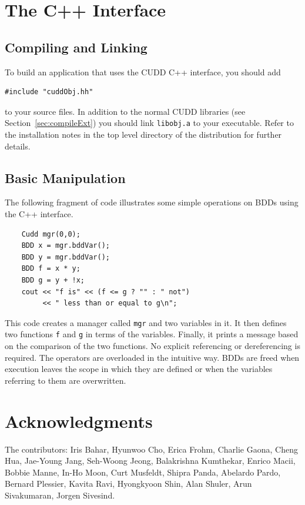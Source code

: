\documentclass[11pt]{article}
\begin{document}

\section{The C++ Interface}
\label{sec:cpp}


\subsection{Compiling and Linking}
\label{sec:compileCpp}

To build an application that uses the CUDD C++ interface, you should
add
\begin{verbatim}
#include "cuddObj.hh"
\end{verbatim}
to your source files. In addition to the normal CUDD libraries (see
Section~\ref{sec:compileExt}) you should link
\verb|libobj.a| to your executable. Refer to the
installation notes in the top level directory of the distribution for
further details.

\subsection{Basic Manipulation}
\label{sec:basicCpp}

The following fragment of code illustrates some simple operations on
BDDs using the C++ interface.
\begin{verbatim}
	Cudd mgr(0,0);
	BDD x = mgr.bddVar();
	BDD y = mgr.bddVar();
	BDD f = x * y;
	BDD g = y + !x;
	cout << "f is" << (f <= g ? "" : " not")
	     << " less than or equal to g\n";
\end{verbatim}
This code creates a manager called \verb|mgr| and two variables in it.
It then defines two functions \verb|f| and \verb|g| in terms of the
variables. Finally, it prints a message based on the comparison of the
two functions. No explicit referencing or dereferencing is required.
The operators are overloaded in the intuitive way. BDDs are freed when
execution leaves the scope in which they are defined or when the
variables referring to them are overwritten.

\section{Acknowledgments}
\label{sec:ack}

The contributors: Iris Bahar, Hyunwoo Cho, Erica Frohm, Charlie Gaona,
Cheng Hua, Jae-Young Jang, Seh-Woong Jeong, Balakrishna Kumthekar,
Enrico Macii, Bobbie Manne, In-Ho Moon, Curt Musfeldt, Shipra Panda,
Abelardo Pardo, Bernard Plessier, Kavita Ravi, Hyongkyoon Shin, Alan
Shuler, Arun Sivakumaran, Jorgen Sivesind.
\end{document}
